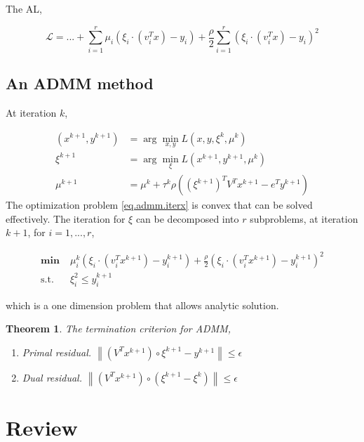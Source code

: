\documentclass[a4paper, 10pt]{article}
\newcommand{\mn}{\mathbf{\min}\;}
\newcommand{\st}{\mathrm{s.t.\;}}
\newtheorem{theorem}[]{Theorem}
\begin{document}
The AL,

\begin{equation}
    \mathcal L = ... + \sum_{i=1}^r \mu_i \left (\xi_i \cdot(v_i^Tx) - y_i\right) + \frac{\rho}{2}\sum_{i=1}^r \left(\xi_i \cdot (v_i^Tx) - y_i\right)^2
\end{equation}

\subsection{An ADMM method}
At iteration \(k\),

\begin{subequations}
    \begin{align}
        \label{eq.admm.iterx}   (x^{k+1}, y^{k+1}) & = \arg\min_{x, y} L\left(x,y,\xi^k,\mu^k\right)                         \\
        \label{eq.admm.iterxi}   \xi^{k+1}         & = \arg\min_{\xi} L\left(x^{k+1}, y^{k+1}, \mu^k\right)                  \\
        \mu^{k+1}                                  & = \mu^k + \tau^k\rho\left((\xi^{k+1})^T V^T x^{k+1} - e^Ty^{k+1}\right)
    \end{align}
\end{subequations}
The optimization problem \eqref{eq.admm.iterx} is convex that can be solved effectively. The iteration for \(\xi\) can be decomposed into \(r\) subproblems, at iteration \(k+1\), for \(i = 1, ..., r\),

\begin{equation}
    \begin{aligned}
        \mn & \mu_i^k \left (\xi_i \cdot(v_i^Tx^{k+1}) - y_i^{k+1}\right) + \frac{\rho}{2} \left(\xi_i \cdot (v_i^Tx^{k+1}) - y_i^{k+1}\right)^2 \\
        \st & \xi_i^2 \le y_i^{k+1}
    \end{aligned}
\end{equation}

which is a one dimension problem that allows analytic solution.

\begin{theorem}
    The termination criterion for ADMM,
    \begin{enumerate}
        \item Primal residual. \(\left \|(V^Tx^{k+1}) \circ \xi^{k+1} - y^{k+1} \right\| \le \epsilon\)
        \item Dual residual. \(\left\|(V^Tx^{k+1}) \circ (\xi^{k+1}-\xi^k)\right\| \le \epsilon\)
    \end{enumerate}
\end{theorem}


% 
% 
\section{Review}
\end{document}
